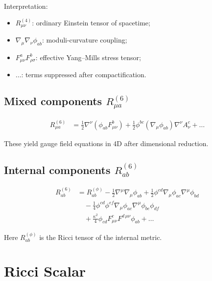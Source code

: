 \documentclass[12pt]{article}
\begin{document}
Interpretation:
\begin{itemize}
\item \(R_{\mu\nu}^{(4)}\): ordinary Einstein tensor of spacetime;
\item \(\nabla_\mu\nabla_\nu\phi_{ab}\): moduli-curvature coupling;
\item \(F^a_{\mu\nu} F^b_{\rho\sigma}\): effective Yang–Mills stress tensor;
\item \(\dots\): terms suppressed after compactification.
\end{itemize}


\subsection{Mixed components \texorpdfstring{$R_{\mu a}^{(6)}$}{Rmua}}

\begin{align}
R_{\mu a}^{(6)}
&=
\frac{1}{2}\nabla^\nu(\phi_{ab}F^b_{\mu\nu})
+ \frac{1}{2}\phi^{bc}(\nabla_\mu\phi_{ab})\nabla^\nu A^c_\nu
+ \dots
\end{align}

These yield gauge field equations in 4D after dimensional reduction.


\subsection{Internal components \texorpdfstring{$R_{ab}^{(6)}$}{Rab}}

\begin{align}
R_{ab}^{(6)}
&=
R_{ab}^{(\phi)}
- \frac{1}{2}\nabla^\mu\nabla_\mu\phi_{ab}
+ \frac{1}{2}\phi^{cd}\nabla_\mu\phi_{ac}\nabla^\mu\phi_{bd}
\nonumber\\
&\quad
- \frac{1}{4} \phi^{cd}\phi^{ef}
\nabla_\mu\phi_{ac}\nabla^\mu\phi_{be}\phi_{df}
\nonumber\\
&\quad
+ \frac{\kappa^2}{4}\phi_{cd}F^{c}_{\mu\nu}F^{d\,\mu\nu}\phi_{ab}
+ \dots
\end{align}

Here \(R_{ab}^{(\phi)}\) is the Ricci tensor of the internal metric.


\newpage
\section{Ricci Scalar}
\end{document}
